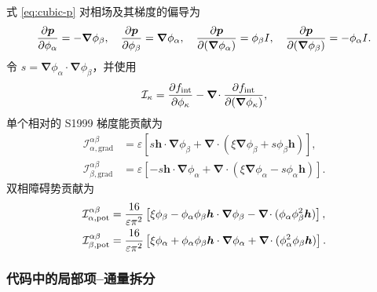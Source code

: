 \documentclass[UTF8,a4paper,11pt]{ctexart}
\newcommand{\grad}{\bm{\nabla}}
\newcommand{\diver}{\bm{\nabla}\!\cdot}
\newcommand{\vct}[1]{\bm{#1}}
\begin{document}
式 \eqref{eq:cubic-p} 对相场及其梯度的偏导为
\begin{equation}
 {\partial\vct p\over\partial\phi_\alpha}=-\grad\phi_\beta,
 \quad {\partial\vct p\over\partial\phi_\beta}=\grad\phi_\alpha,
 \quad {\partial\vct p\over\partial(\grad\phi_\alpha)}=\phi_\beta I,
 \quad {\partial\vct p\over\partial(\grad\phi_\beta)}=-\phi_\alpha I.
 \label{eq:dp-dphi}
\end{equation}
令 $s=\grad\phi_\alpha\cdot\grad\phi_\beta$，并使用
\begin{equation}
 \mathcal I_\kappa={\partial f_{\mathrm{int}}\over\partial\phi_\kappa}
 -\diver{\partial f_{\mathrm{int}}\over\partial(\grad\phi_\kappa)},
\end{equation}
单个相对的 S1999 梯度能贡献为
\begin{align}
 \mathcal I_{\alpha,\mathrm{grad}}^{\alpha\beta}
 &=\varepsilon\left[s\vct h\cdot\grad\phi_\beta
 +\diver\left(\xi\grad\phi_\beta+s\phi_\beta\vct h\right)\right],\\
 \mathcal I_{\beta,\mathrm{grad}}^{\alpha\beta}
 &=\varepsilon\left[-s\vct h\cdot\grad\phi_\alpha
 +\diver\left(\xi\grad\phi_\alpha-s\phi_\alpha\vct h\right)\right].
 \label{eq:cubic-grad-var}
\end{align}
双相障碍势贡献为
\begin{align}
 \mathcal I_{\alpha,\mathrm{pot}}^{\alpha\beta}
 &={16\over\varepsilon\pi^2}\left[
 \xi\phi_\beta-\phi_\alpha\phi_\beta\vct h\cdot\grad\phi_\beta
 -\diver(\phi_\alpha\phi_\beta^2\vct h)\right],\\
 \mathcal I_{\beta,\mathrm{pot}}^{\alpha\beta}
 &={16\over\varepsilon\pi^2}\left[
 \xi\phi_\alpha+\phi_\alpha\phi_\beta\vct h\cdot\grad\phi_\alpha
 +\diver(\phi_\alpha^2\phi_\beta\vct h)\right].
 \label{eq:cubic-pot-var}
\end{align}

\subsubsection{代码中的局部项--通量拆分}
\end{document}
